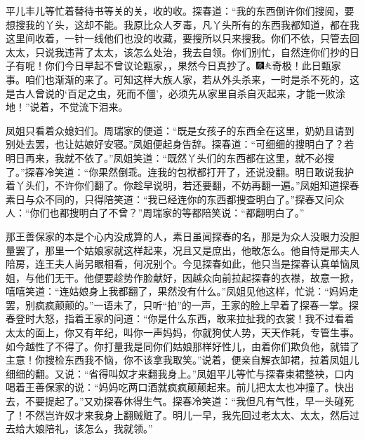 平儿丰儿等忙着替待书等关的关，收的收。探春道：``我的东西倒许你们搜阅，要想搜我的丫头，这却不能。我原比众人歹毒，凡丫头所有的东西我都知道，都在我这里间收着，一针一线他们也没的收藏，要搜所以只来搜我。你们不依，只管去回太太，只说我违背了太太，该怎么处治，我去自领。你们别忙，自然连你们抄的日子有呢！你们今日早起不曾议论甄家，，果然今日真抄了。{\includegraphics[width=3mm]{../Images/00004}\includegraphics[width=3mm]{../Images/00012}\footnotesize \kaishu 奇极！此日甄家事。}咱们也渐渐的来了。可知这样大族人家，若从外头杀来，一时是杀不死的，这是古人曾说的`百足之虫，死而不僵'，必须先从家里自杀自灭起来，才能一败涂地！''说着，不觉流下泪来。

凤姐只看着众媳妇们。周瑞家的便道：``既是女孩子的东西全在这里，奶奶且请到别处去罢，也让姑娘好安寝。''凤姐便起身告辞。探春道：``可细细的搜明白了？若明日再来，我就不依了。''凤姐笑道：``既然丫头们的东西都在这里，就不必搜了。''探春冷笑道：``你果然倒乖。连我的包袱都打开了，还说没翻。明日敢说我护着丫头们，不许你们翻了。你趁早说明，若还要翻，不妨再翻一遍。''凤姐知道探春素日与众不同的，只得陪笑道：``我已经连你的东西都搜查明白了。''探春又问众人：``你们也都搜明白了不曾？''周瑞家的等都陪笑说：``都翻明白了。''

那王善保家的本是个心内没成算的人，素日虽闻探春的名，那是为众人没眼力没胆量罢了，那里一个姑娘家就这样起来，况且又是庶出，他敢怎么。他自恃是邢夫人陪房，连王夫人尚另眼相看，何况别个。今见探春如此，他只当是探春认真单恼凤姐，与他们无干。他便要趁势作脸献好，因越众向前拉起探春的衣襟，故意一掀，嘻嘻笑道：``连姑娘身上我都翻了，果然没有什么。''凤姐见他这样，忙说：``妈妈走罢，别疯疯颠颠的。''一语未了，只听``拍''的一声，王家的脸上早着了探春一掌。探春登时大怒，指着王家的问道：``你是什么东西，敢来拉扯我的衣裳！我不过看着太太的面上，你又有年纪，叫你一声妈妈，你就狗仗人势，天天作耗，专管生事。如今越性了不得了。你打量我是同你们姑娘那样好性儿，由着你们欺负他，就错了主意！你搜检东西我不恼，你不该拿我取笑。''说着，便亲自解衣卸裙，拉着凤姐儿细细的翻。又说：``省得叫奴才来翻我身上。''凤姐平儿等忙与探春束裙整袂，口内喝着王善保家的说：``妈妈吃两口酒就疯疯颠颠起来。前儿把太太也冲撞了。快出去，不要提起了。''又劝探春休得生气。探春冷笑道：``我但凡有气性，早一头碰死了！不然岂许奴才来我身上翻贼赃了。明儿一早，我先回过老太太、太太，然后过去给大娘陪礼，该怎么，我就领。''

